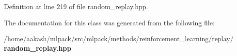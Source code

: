 Definition at line 219 of file random\+\_\+replay.\+hpp.



The documentation for this class was generated from the following file\+:\begin{DoxyCompactItemize}
\item 
/home/aakash/mlpack/src/mlpack/methods/reinforcement\+\_\+learning/replay/\textbf{ random\+\_\+replay.\+hpp}\end{DoxyCompactItemize}
